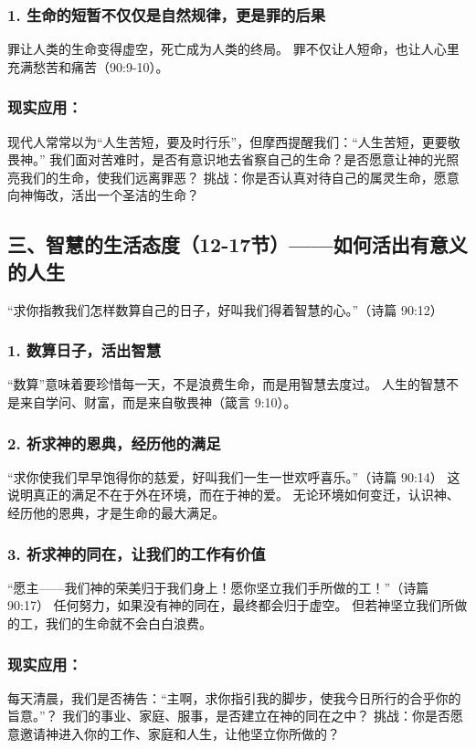 \documentclass[a4paper, 12pt]{article}
\begin{document}
\subsubsection*{1. 生命的短暂不仅仅是自然规律，更是罪的后果}
罪让人类的生命变得虚空，死亡成为人类的终局。
罪不仅让人短命，也让人心里充满愁苦和痛苦（90:9-10）。
\subsubsection*{现实应用：}

现代人常常以为“人生苦短，要及时行乐”，但摩西提醒我们：“人生苦短，更要敬畏神。”
我们面对苦难时，是否有意识地去省察自己的生命？是否愿意让神的光照亮我们的生命，使我们远离罪恶？
挑战：你是否认真对待自己的属灵生命，愿意向神悔改，活出一个圣洁的生命？

\subsection*{三、智慧的生活态度（12-17节）——如何活出有意义的人生}
“求你指教我们怎样数算自己的日子，好叫我们得着智慧的心。”（诗篇 90:12）

\subsubsection*{1. 数算日子，活出智慧}
“数算”意味着要珍惜每一天，不是浪费生命，而是用智慧去度过。
人生的智慧不是来自学问、财富，而是来自敬畏神（箴言 9:10）。
\subsubsection*{2. 祈求神的恩典，经历他的满足}
“求你使我们早早饱得你的慈爱，好叫我们一生一世欢呼喜乐。”（诗篇 90:14）
这说明真正的满足不在于外在环境，而在于神的爱。
无论环境如何变迁，认识神、经历他的恩典，才是生命的最大满足。
\subsubsection*{3. 祈求神的同在，让我们的工作有价值}
“愿主——我们神的荣美归于我们身上！愿你坚立我们手所做的工！”（诗篇 90:17）
任何努力，如果没有神的同在，最终都会归于虚空。
但若神坚立我们所做的工，我们的生命就不会白白浪费。
\subsubsection*{现实应用：}

每天清晨，我们是否祷告：“主啊，求你指引我的脚步，使我今日所行的合乎你的旨意。”？
我们的事业、家庭、服事，是否建立在神的同在之中？
挑战：你是否愿意邀请神进入你的工作、家庭和人生，让他坚立你所做的？
\end{document}
